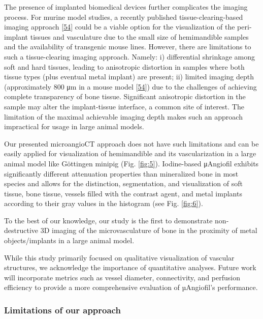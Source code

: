 The presence of implanted biomedical devices further complicates the imaging process.
For murine model studies, a recently published tissue-clearing-based imaging approach {[}\protect\hyperlink{ref-11349lK8v}{54}{]} could be a viable option for the visualization of the peri-implant tissues and vasculature due to the small size of hemimandible samples and the availability of transgenic mouse lines.
However, there are limitations to such a tissue-clearing imaging approach.
Namely:
i) differential shrinkage among soft and hard tissues, leading to anisotropic distortion in samples where both tissue types (plus eventual metal implant) are present;
ii) limited imaging depth (approximately 800 μm in a mouse model {[}\protect\hyperlink{ref-11349lK8v}{54}{]}) due to the challenges of achieving complete transparency of bone tissue.
Significant anisotropic distortion in the sample may alter the implant-tissue interface, a common site of interest.
The limitation of the maximal achievable imaging depth makes such an approach impractical for usage in large animal models.

Our presented microangioCT approach does not have such limitations and can be easily applied for visualization of hemimandible and its vascularization in a large animal model like Göttingen minipig (Fig. \ref{fig:5}).
Iodine-based μAngiofil exhibits significantly different attenuation properties than mineralized bone in most species and allows for the distinction, segmentation, and visualization of soft tissue, bone tissue, vessels filled with the contrast agent, and metal implants according to their gray values in the histogram (see Fig. \ref{fig:6}).

To the best of our knowledge, our study is the first to demonstrate non-destructive 3D imaging of the microvasculature of bone in the proximity of metal objects/implants in a large animal model.

While this study primarily focused on qualitative visualization of vascular structures, we acknowledge the importance of quantitative analyses.
Future work will incorporate metrics such as vessel diameter, connectivity, and perfusion efficiency to provide a more comprehensive evaluation of µAngiofil's performance.

\hypertarget{limitations-of-our-approach}{%
\subsubsection{Limitations of our approach}\label{limitations-of-our-approach}}


